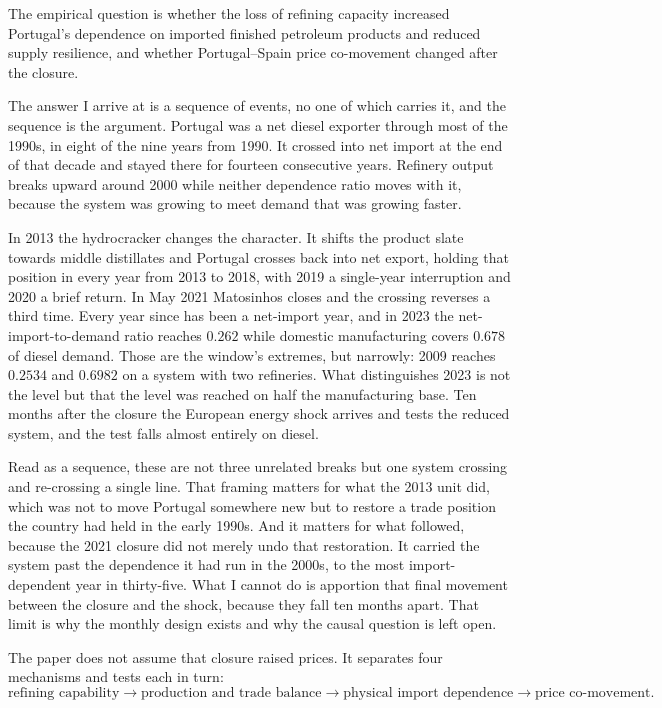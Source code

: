 \documentclass[11pt,a4paper]{article}
\begin{document}
The empirical question is whether the loss of refining capacity increased Portugal's dependence
on imported finished petroleum products and reduced supply resilience, and whether
Portugal--Spain price co-movement changed after the closure.

The answer I arrive at is a sequence of events, no one of which carries it, and the sequence is
the argument. Portugal was a net diesel exporter through most of the 1990s, in eight of the nine
years from 1990. It crossed into net import at the end of that decade and stayed there for
fourteen consecutive years. Refinery output breaks upward around 2000 while neither dependence
ratio moves with it, because the system was growing to meet demand that was growing faster.

In 2013 the hydrocracker changes the character. It shifts the product slate towards middle
distillates and Portugal crosses back into net export, holding that position in every year
from 2013 to 2018, with 2019 a single-year interruption and 2020 a brief return. In May 2021
Matosinhos closes and the crossing reverses a third time. Every year since has been a
net-import year, and in 2023 the net-import-to-demand ratio reaches $0.262$ while domestic
manufacturing covers $0.678$ of diesel demand. Those are the window's extremes, but narrowly:
2009 reaches $0.2534$ and $0.6982$ on a system with two refineries. What distinguishes 2023 is
not the level but that the level was reached on half the manufacturing base. Ten months after the
closure the European energy shock arrives and tests the reduced system, and the test falls
almost entirely on diesel.

Read as a sequence, these are not three unrelated breaks but one system crossing and re-crossing
a single line. That framing matters for what the 2013 unit did, which was not to move Portugal
somewhere new but to restore a trade position the country had held in the early 1990s. And it
matters for what followed, because the 2021 closure did not merely undo that restoration. It
carried the system past the dependence it had run in the 2000s, to the most import-dependent
year in thirty-five. What I cannot do is apportion that final movement between the closure and
the shock, because they fall ten months apart. That limit is why the monthly design exists and
why the causal question is left open.

The paper does not assume that closure raised prices. It separates four mechanisms and tests
each in turn:
\[
\text{refining capability} \rightarrow \text{production and trade balance} \rightarrow
\text{physical import dependence} \rightarrow \text{price co-movement}.
\]
\end{document}
